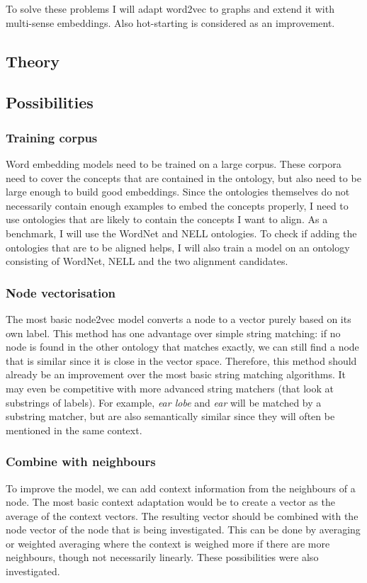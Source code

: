 \documentclass{article}
\begin{document}
 To solve these problems I will adapt word2vec to graphs and extend it with multi-sense embeddings. Also hot-starting is considered as an improvement.
 
 \subsection{Theory}
 \subsection{Possibilities} %
  \subsubsection{Training corpus}
  Word embedding models need to be trained on a large corpus. These corpora need to cover the concepts that are contained in the ontology, but also need to be large enough to build good embeddings. Since the ontologies themselves do not necessarily contain enough examples to embed the concepts properly, I need to use ontologies that are likely to contain the concepts I want to align.
  As a benchmark, I will use the WordNet and NELL ontologies. To check if adding the ontologies that are to be aligned helps, I will also train a model on an ontology consisting of WordNet, NELL and the two alignment candidates.
  \subsubsection{Node vectorisation}
  The most basic node2vec model converts a node to a vector purely based on its own label. This method has one advantage over simple string matching: if no node is found in the other ontology that matches exactly, we can still find a node that is similar since it is close in the vector space. Therefore, this method should already be an improvement over the most basic string matching algorithms. It may even be competitive with more advanced string matchers (that look at substrings of labels). For example, \emph{ear lobe} and \emph{ear} will be matched by a substring matcher, but are also semantically similar since they will often be mentioned in the same context.
  \subsubsection{Combine with neighbours}
  To improve the model, we can add context information from the neighbours of a node. The most basic context adaptation would be to create a vector as the average of the context vectors. The resulting vector should be combined with the node vector of the node that is being investigated. This can be done by averaging or weighted averaging where the context is weighed more if there are more neighbours, though not necessarily linearly. These possibilities were also investigated.
\end{document}
